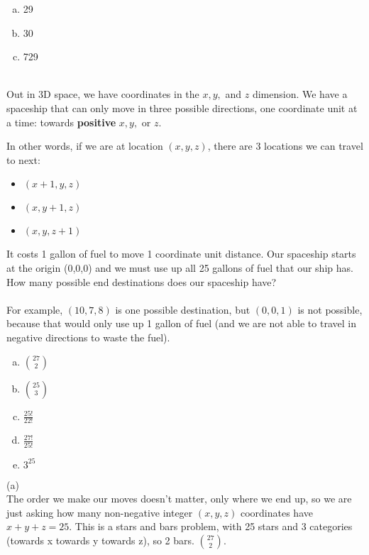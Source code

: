 \begin{solution}
\begin{enumerate}[(a)]
	\item  29
    
	\item  30
    
	\item  729

\end{enumerate}
\\
Out in 3D space, we have coordinates in the $x, y,$ and $z$ dimension. We have a spaceship that can only move in three possible directions, one coordinate unit at a time: towards \textbf{positive} $x, y,$ or $z$. 

In other words, if we are at location $(x,y,z)$, there are 3 locations we can travel to next:
\begin{itemize}
    \item $(x+1,y,z)$
    \item $(x,y+1,z)$
    \item $(x,y,z+1)$
\end{itemize}

It costs 1 gallon of fuel to move 1 coordinate unit distance. Our spaceship starts at the origin (0,0,0) and we must use up all 25 gallons of fuel that our ship has.  How many possible end destinations does our spaceship have? \\\\
For example, $(10,7,8)$ is one possible destination, but $(0,0,1)$ is not possible, because that would only use up 1 gallon of fuel (and we are not able to travel in negative directions to waste the fuel).
\begin{enumerate}[a)]
    \item $\binom{27}{2}$
    \item $\binom{25}{3}$
    \item $\frac{25!}{22!}$
    \item $\frac{27!}{25!}$
    \item $3^{25}$
\end{enumerate}
\begin{solution}
(a) \\
The order we make our moves doesn't matter, only where we end up, so we are just asking how many non-negative integer $(x,y,z)$ coordinates have $x+y+z=25$.  This is a stars and bars problem, with 25 stars and 3 categories (towards x towards y towards z), so 2 bars.   $\binom{27}{2}$. 
\end{solution}


\end{solution}
